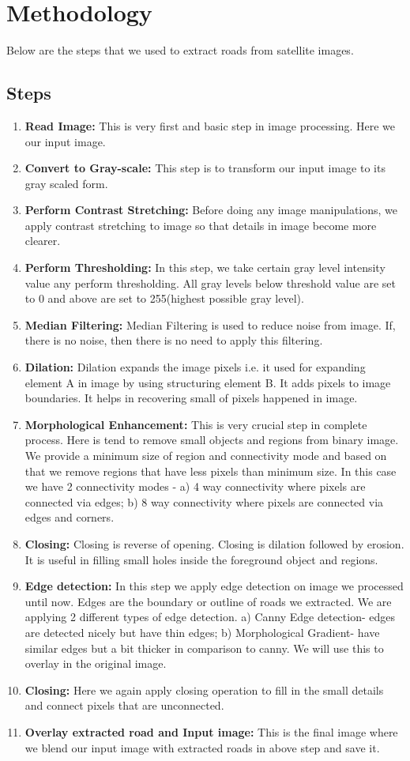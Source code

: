 \documentclass[12pt,a4paper]{article}
\begin{document}
\newpage
\section{Methodology}
Below are the steps that we used to extract roads from satellite images.
\subsection{Steps}
\begin{enumerate}
\item \textbf{Read Image:} This is very first and basic step in image processing. Here we our input image.
\item \textbf{Convert to Gray-scale:} This step is to transform our input image to its gray scaled form.
\item \textbf{Perform Contrast Stretching:} Before doing any image manipulations, we apply contrast stretching to image so that details in image become more clearer.
\item \textbf{Perform Thresholding:} In this step, we take certain gray level intensity value any perform thresholding. All gray levels below threshold value are set to 0 and above are set to 255(highest possible gray level).
\item  \textbf{Median Filtering:} Median Filtering is used to reduce noise from image. If, there is no noise, then there is no need to apply this filtering.
\item \textbf{Dilation:} Dilation expands the image pixels i.e. it used for expanding element A in image by using structuring element B. It adds pixels to image boundaries. It helps in recovering small of pixels happened in image.
\item \textbf{Morphological Enhancement:} This is very crucial step in complete process. Here is tend to remove small objects and regions from binary image. We provide a minimum size of region and connectivity mode and based on that we remove regions that have less pixels than minimum size. In this case we have 2 connectivity modes - a) 4 way connectivity where pixels are connected via edges; b) 8 way connectivity where pixels are connected via edges and corners.
\item \textbf{Closing:} Closing is reverse of opening. Closing is dilation followed by erosion. It is useful in filling small holes inside the foreground object and regions.
\item \textbf{Edge detection:} In this step we apply edge detection on image we processed until now. Edges are the boundary or outline of roads we extracted. We are applying 2 different types of edge detection. a) Canny Edge detection- edges are detected nicely but have thin edges; b) Morphological Gradient- have similar edges but a bit thicker in comparison to canny. We will use this to overlay in the original image.
\item \textbf{Closing:} Here we again apply closing operation to fill in the small details and connect pixels that are unconnected.
\item \textbf{Overlay extracted road and Input image:} This is the final image where we blend our input image with extracted roads in above step and save it.\textbf{}
\end{enumerate}
\end{document}
